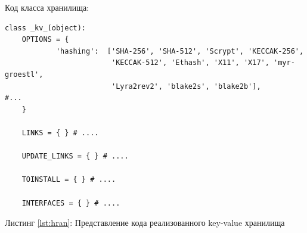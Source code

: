 Код класса хранилища:
\begin{center}
\begin{lstlisting}
class _kv_(object):
    OPTIONS = {
            'hashing':  ['SHA-256', 'SHA-512', 'Scrypt', 'KECCAK-256',
                         'KECCAK-512', 'Ethash', 'X11', 'X17', 'myr-groestl',
                         'Lyra2rev2', 'blake2s', 'blake2b'],
#...                    
    }

    LINKS = { } # ....

    UPDATE_LINKS = { } # ....

    TOINSTALL = { } # ....

    INTERFACES = { } # ....
    \end{lstlisting}\label{lst:hran}
    Листинг \ref{lst:hran}: Представление кода реализованного key-value хранилища
\end{center}


